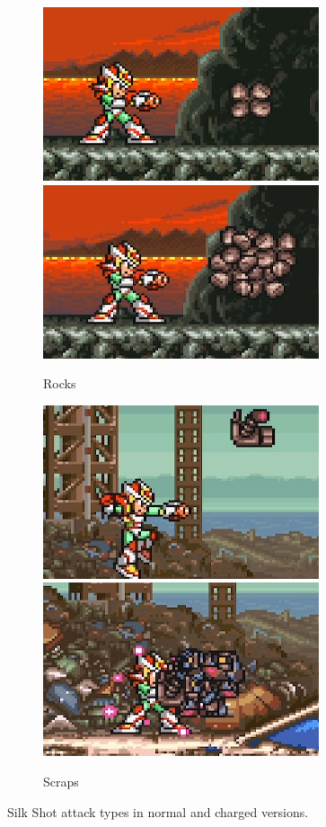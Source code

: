 \begin{figure}
	\ContinuedFloat
	\centering
	\begin{subfigure}{\linewidth}
		\centering
		\includegraphics[width=0.4\linewidth]{figures/X2/weapons/S_shot_5.png}	
		\includegraphics[width=0.4\linewidth]{figures/X2/weapons/S_shot_6.png}	
		\caption{Rocks}	
	\end{subfigure}
	\begin{subfigure}{\linewidth}
		\centering
		\includegraphics[width=0.4\linewidth]{figures/X2/weapons/S_shot_7.png}	
		\includegraphics[width=0.4\linewidth]{figures/X2/weapons/S_shot_8.png}	
		\caption{Scraps}
	\end{subfigure}
	\caption{Silk Shot attack types in normal and charged versions.}
\end{figure}


